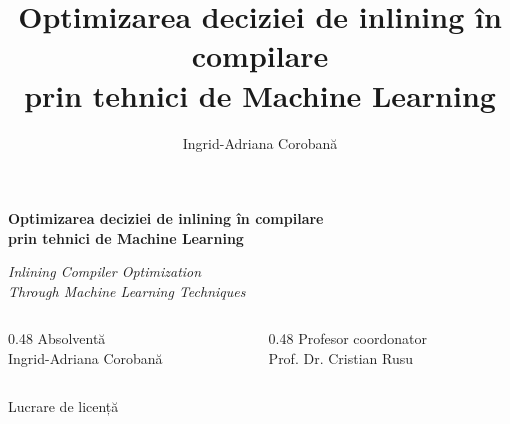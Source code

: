 \documentclass[aspectratio=169,11pt]{beamer}
\title{Optimizarea deciziei de inlining în compilare\\prin tehnici de Machine Learning}
\subtitle{}
\author{Ingrid-Adriana Corobană}
\institute{Profesor coordonator\\Prof. Dr. Cristian Rusu}
\date{}
\begin{document}
\begin{frame}[plain]
\vspace{0.65cm}
\begin{center}
{\Large\bfseries Optimizarea deciziei de inlining în compilare\\[0.15cm]prin tehnici de Machine Learning}

\vspace{0.35cm}
{\normalsize\itshape Inlining Compiler Optimization\\Through Machine Learning Techniques}

\vspace{0.85cm}
\begin{columns}[T,onlytextwidth]
\begin{column}{0.48\textwidth}
\centering
{\normalsize Absolventă}\\[0.12cm]
{\large Ingrid-Adriana Corobană}
\end{column}
\begin{column}{0.48\textwidth}
\centering
{\normalsize Profesor coordonator}\\[0.12cm]
{\large Prof. Dr. Cristian Rusu}
\end{column}
\end{columns}

\vspace{0.85cm}
{\normalsize Lucrare de licență}
\end{center}
\end{frame}
\end{document}

